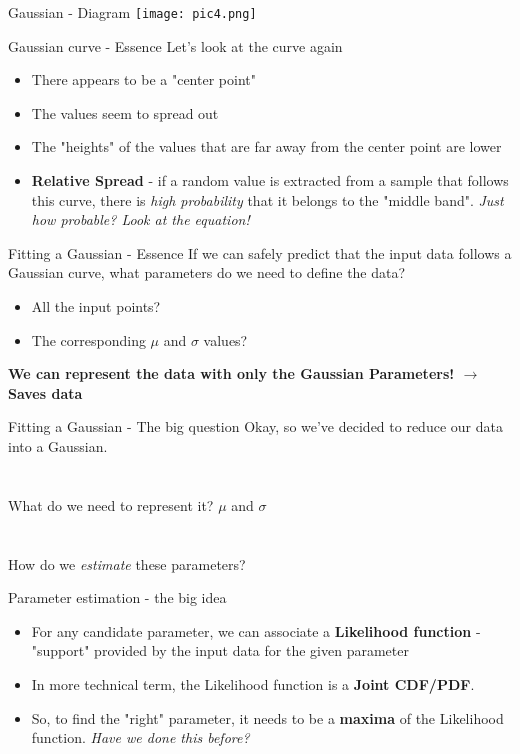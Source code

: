 \documentclass{beamer}
\begin{document}
\begin{frame}{Gaussian - Diagram}
\texttt{[image: pic4.png]}
\end{frame}

\begin{frame}{Gaussian curve - Essence}
    Let's look at the curve again
    \begin{itemize}
        \item There appears to be a "center point" 
        \item The values seem to spread out 
        \item The "heights" of the values that are far away from the center point are lower
        \item \textbf{Relative Spread} - if a random value is extracted from a sample that follows this curve, there is \textit{high probability} that it belongs to the "middle band". \textit{Just how probable? Look at the equation!}
    \end{itemize}
\end{frame}

\begin{frame}{Fitting a Gaussian - Essence}
    If we can safely predict that the input data follows a Gaussian curve, what parameters do we need to define the data?
    \begin{itemize}
        \item All the input points? 
        \item The corresponding $\mu$ and $\sigma$ values?
    \end{itemize}
    
    \textbf{We can represent the data with only the Gaussian Parameters! $\rightarrow$ Saves data}
\end{frame}

\begin{frame}{Fitting a Gaussian - The big question}
    Okay, so we've decided to reduce our data into a Gaussian. \\ \\ \\
    What do we need to represent it? $\mu$ and $\sigma$ \\ \\ \\
    How do we \textit{estimate} these parameters?
\end{frame}

\begin{frame}{Parameter estimation - the big idea}
    \begin{itemize}
        \item For any candidate parameter, we can associate a \textbf{Likelihood function} - "support" provided by the input data for the given parameter
        \item In more technical term, the Likelihood function is a \textbf{Joint CDF/PDF}.
        \item So, to find the "right" parameter, it needs to be a \textbf{maxima} of the Likelihood function. \textit{Have we done this before?}
    \end{itemize}
\end{frame}
\end{document}
